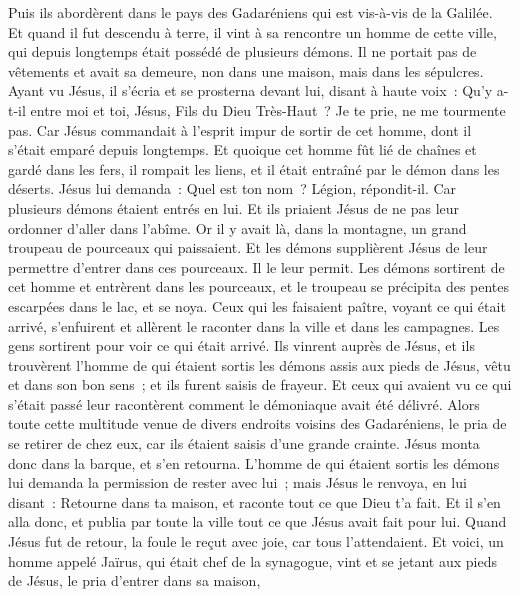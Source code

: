 \begin{multicols}{2}
Puis ils abordèrent dans le pays des Gadaréniens qui est vis-à-vis de la Galilée.
Et quand il fut descendu à terre, il vint à sa rencontre un homme de cette ville, qui depuis longtemps était possédé de plusieurs démons. Il ne portait pas de vêtements et avait sa demeure, non dans une maison, mais dans les sépulcres.
Ayant vu Jésus, il s'écria et se prosterna devant lui, disant à haute voix~: Qu'y a-t-il entre moi et toi, Jésus, Fils du Dieu Très-Haut~? Je te prie, ne me tourmente pas.
Car Jésus commandait à l'esprit impur de sortir de cet homme, dont il s'était emparé depuis longtemps. Et quoique cet homme fût lié de chaînes et gardé dans les fers, il rompait les liens, et il était entraîné par le démon dans les déserts.
Jésus lui demanda~: Quel est ton nom~? Légion, répondit-il. Car plusieurs démons étaient entrés en lui.
Et ils priaient Jésus de ne pas leur ordonner d'aller dans l'abîme.
Or il y avait là, dans la montagne, un grand troupeau de pourceaux qui paissaient. Et les démons supplièrent Jésus de leur permettre d'entrer dans ces pourceaux. Il le leur permit.
Les démons sortirent de cet homme et entrèrent dans les pourceaux, et le troupeau se précipita des pentes escarpées dans le lac, et se noya.
Ceux qui les faisaient paître, voyant ce qui était arrivé, s'enfuirent et allèrent le raconter dans la ville et dans les campagnes.
Les gens sortirent pour voir ce qui était arrivé. Ils vinrent auprès de Jésus, et ils trouvèrent l'homme de qui étaient sortis les démons assis aux pieds de Jésus, vêtu et dans son bon sens~; et ils furent saisis de frayeur.
Et ceux qui avaient vu ce qui s'était passé leur racontèrent comment le démoniaque avait été délivré.
Alors toute cette multitude venue de divers endroits voisins des Gadaréniens, le pria de se retirer de chez eux, car ils étaient saisis d'une grande crainte. Jésus monta donc dans la barque, et s'en retourna.
L'homme de qui étaient sortis les démons lui demanda la permission de rester avec lui~; mais Jésus le renvoya, en lui disant~:
Retourne dans ta maison, et raconte tout ce que Dieu t'a fait. Et il s'en alla donc, et publia par toute la ville tout ce que Jésus avait fait pour lui.
Quand Jésus fut de retour, la foule le reçut avec joie, car tous l'attendaient.
Et voici, un homme appelé Jaïrus, qui était chef de la synagogue, vint et se jetant aux pieds de Jésus, le pria d'entrer dans sa maison,

\end{multicols}
